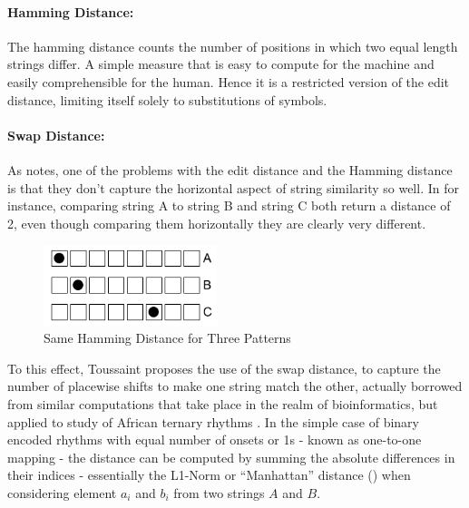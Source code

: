 \paragraph{Hamming Distance:} The hamming distance counts the number of positions in which two equal length strings differ. A simple measure that is easy to compute for the machine and easily comprehensible for the human. Hence it is a restricted version of the edit distance, limiting itself solely to substitutions of symbols.

\paragraph{Swap Distance:} As \cite{Toussaint2013} notes, one of the problems with the edit distance and the Hamming distance is that they don’t capture the horizontal aspect of string similarity so well. In  for instance, comparing string A to string B and string C both return a distance of 2, even though comparing them horizontally they are clearly very different.

\begin{figure}
	\begin{center}
		\includegraphics[width=0.45\textwidth]{ch03_symbolic/figures/hamming_comparison.png}
	\end{center}
	\caption[Hamming Distance Comparison]{Same Hamming Distance for Three Patterns}
	\label{fig:hamming_comparison}
\end{figure}

To this effect, Toussaint proposes the use of the swap distance, to capture the number of placewise shifts to make one string match the other, actually borrowed from similar computations that take place in the realm of bioinformatics, but applied to study of African ternary rhythms \citep{Toussaint2003}. In the simple case of binary encoded rhythms with equal number of onsets or 1s - known as one-to-one mapping - the distance can be computed by summing the absolute differences in their indices \citep{Toussaint2016} - essentially the L1-Norm or ``Manhattan'' distance () when considering element $a_i$ and $b_i$ from two strings $A$ and $B$.

